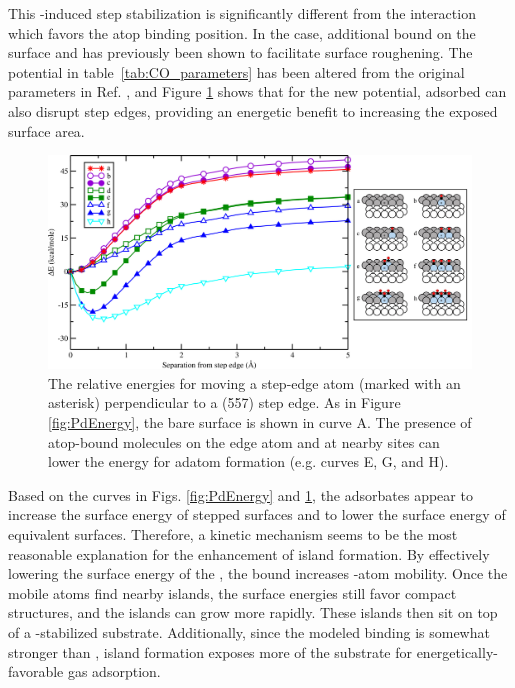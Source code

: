 This -induced step stabilization is significantly different
from the  interaction which favors the atop binding
position. In the  case, additional bound  on
the surface and has previously been shown to facilitate surface
roughening.\citep{Michalka:2013aa} The  potential in
table~\ref{tab:CO_parameters} has been altered from the original
parameters in Ref. \citep{Michalka:2013aa}, and Figure
\ref{fig:PtEnergy} shows that for the new potential, adsorbed 
can also disrupt step edges, providing an energetic benefit to
increasing the exposed  surface area.

\begin{landscape}
\begin{figure}[p!]
  \includegraphics[width=0.9\linewidth]{../figures/chap3/PtEnergy_CO.pdf}
  \caption{The relative energies for moving a step-edge  atom
    (marked with an asterisk) perpendicular to a (557) step edge.  As in
    Figure \ref{fig:PdEnergy}, the bare surface is shown in curve A.
    The presence of atop-bound  molecules on the edge atom and
    at nearby sites can lower the energy for adatom formation
    (e.g. curves E, G, and H).} \label{fig:PtEnergy}
\end{figure}
\end{landscape}

Based on the curves in Figs. \ref{fig:PdEnergy} and
\ref{fig:PtEnergy}, the  adsorbates appear to increase the
surface energy of stepped  surfaces and to lower the surface
energy of equivalent  surfaces.  Therefore, a kinetic mechanism
seems to be the most reasonable explanation for the enhancement of island
formation.  By effectively lowering the surface energy of the ,
the bound  increases -atom mobility.  Once the mobile
 atoms find nearby islands, the surface energies still favor
compact structures, and the islands can grow more rapidly. These
islands then sit on top of a -stabilized  substrate.
Additionally, since the modeled  binding is somewhat
stronger than , island formation exposes more of the
 substrate for energetically-favorable gas adsorption.

